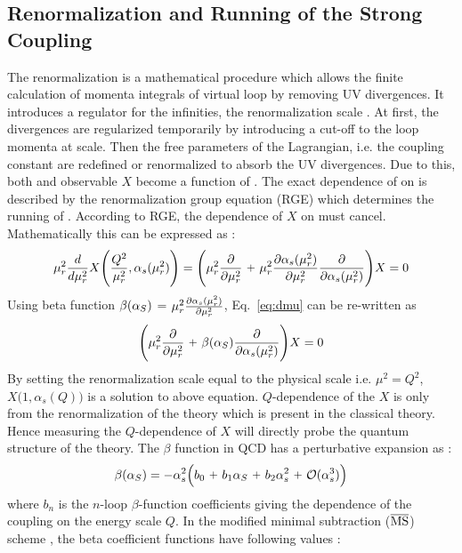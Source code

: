 \subsection{Renormalization and Running of the Strong Coupling}
The renormalization is a mathematical procedure which allows the finite calculation of momenta integrals of virtual loop by removing UV divergences. It introduces a regulator for the infinities, the renormalization scale \mur. At first, the divergences are regularized temporarily by introducing a cut-off to the loop momenta at \mur scale. Then the free parameters of the Lagrangian, i.e. the coupling constant are redefined or renormalized to absorb the UV divergences. Due to this, both \alpsq and observable $X$ become a function of \mur. The exact dependence of \alpsmusq on \mur is described by the renormalization group equation (RGE) which determines the running of \alpsmusq. According to RGE, the dependence of $X$ on \mur must cancel. Mathematically this can be expressed as : 
\begin{equation}
\mur^{2}\frac{d}{d\mur^{2}}X\Bigg(\frac{Q^{2}}{\mur^{2}},\alpha_{s}(\mur^{2})\Bigg)=
\Bigg(\mur^{2}\frac{\partial}{\partial\mur^{2}}~\plus \mur^{2}\frac{\partial\alpha_{s}(\mur^{2})}
{\partial\mur^{2}}\frac{\partial}{\partial\alpha_{s}(\mur^{2})}\Bigg)X=0
\label{eq:dmu}
\end{equation}
Using beta function $\beta(\alpha_S)$ = $\mur^{2}\frac{\partial\alpha_{s}(\mur^{2})}{\partial\mur^{2}}$, Eq.~\ref{eq:dmu} can be re-written as 
\begin{equation}
\Bigg(\mur^{2}\frac{\partial}{\partial\mur^{2}}~\plus \beta(\alps)\frac{\partial}{\partial\alpha_{s}(\mur^{2})}\Bigg)X=0
\label{eq:dmu2}
\end{equation}
By setting the renormalization scale equal to the physical scale i.e. $\mu^{2}=Q^{2}$, $X\big(1,\alpha_{s}(Q)\big)$ is a solution to above equation. $Q$-dependence of the $X$ is only from the renormalization of the theory which is present in the classical theory. Hence measuring the $Q$-dependence of $X$ will directly probe the quantum structure of the theory. The $\beta$ function in QCD has a perturbative expansion as : 
\begin{equation}
\beta(\alps)=-\alpha_{s}^{2}\Big(b_0~\plus b_1\alps~\plus b_2\alpha_{s}^{2}~\plus {\cal O}(\alpha_{s}^{3})\Big) 
\label{eq:beta}
\end{equation}
where $b_n$ is the $n$-loop $\beta$-function coefficients giving the dependence of the coupling on the energy scale $Q$. In the modified minimal subtraction ($\overline{\rm MS}$) scheme \cite{tHooft:1973mfk,Weinberg:1951ss}, the beta coefficient functions have following values :
